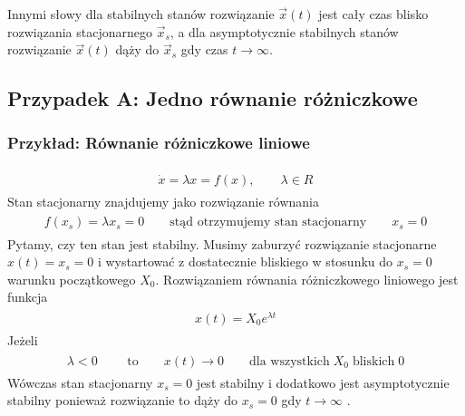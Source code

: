 \documentclass[a4paper,12pt,polish]{sphinxmanual}
\begin{document}
Innymi słowy dla stabilnych stanów rozwiązanie $\vec x(t)$ jest cały czas blisko rozwiązania stacjonarnego $\vec x_s$, a dla asymptotycznie stabilnych stanów rozwiązanie $\vec x(t)$ dąży do $\vec x_s$  gdy czas $t\to \infty$.


\subsection{Przypadek A: Jedno równanie różniczkowe}
\label{ch1/chI023:przypadek-a-jedno-rownanie-rozniczkowe}

\subsubsection{Przykład: Równanie różniczkowe liniowe}
\label{ch1/chI023:przyklad-rownanie-rozniczkowe-liniowe}\label{ch1/chI023:equation-eqn5}\begin{gather}
\begin{split}\dot x = \lambda x = f(x), \qquad \lambda  \in R\end{split}\label{ch1/chI023-eqn5}
\end{gather}
Stan stacjonarny znajdujemy jako rozwiązanie równania
\label{ch1/chI023:equation-eqn6}\begin{gather}
\begin{split}f(x_s) = \lambda x_s =0 \qquad \mbox{stąd otrzymujemy stan stacjonarny} \qquad x_s = 0\end{split}\label{ch1/chI023-eqn6}
\end{gather}
Pytamy, czy ten stan jest stabilny. Musimy zaburzyć rozwiązanie stacjonarne $x(t) = x_s = 0$ i wystartować z dostatecznie bliskiego w stosunku do $x_s=0$ warunku początkowego $X_0$. Rozwiązaniem równania różniczkowego liniowego jest funkcja
\label{ch1/chI023:equation-eqn7}\begin{gather}
\begin{split}x(t) = X_0 e^{\lambda t}\end{split}\label{ch1/chI023-eqn7}
\end{gather}
Jeżeli
\label{ch1/chI023:equation-eqn8}\begin{gather}
\begin{split}\lambda  < 0  \qquad \mbox{ to} \qquad x(t) \to 0 \qquad \mbox{dla wszystkich}  \;   X_0  \;  \mbox{bliskich} \; 0\end{split}\label{ch1/chI023-eqn8}
\end{gather}
Wówczas stan stacjonarny $x_s=0$ jest stabilny i dodatkowo jest asymptotycznie stabilny ponieważ rozwiązanie to dąży do $x_s =0$  gdy  $t\to \infty$ .
\end{document}
